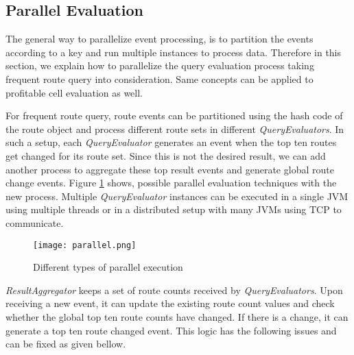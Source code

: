 \subsection{Parallel Evaluation}
The general way to parallelize event processing, is to partition the events according to a key and run multiple instances to process data. Therefore in this section, we explain how to parallelize the query evaluation process taking frequent route query into consideration. Same concepts can be applied to profitable cell evaluation as well.

For frequent route query, route events can be partitioned using the hash code of the route object and process different route sets in different \textit{QueryEvaluators}. In such a setup, each \textit{QueryEvaluator} generates an event when the top ten routes get changed for its route set. Since this is not the desired result, we can add another process to aggregate these top result events and generate global route change events. Figure \ref{parallel} shows, possible parallel evaluation techniques with the new process. Multiple \textit{QueryEvaluator} instances can be executed in a single JVM using multiple threads or in a distributed setup with many JVMs using TCP to communicate. 

\begin{figure}[!t]
        \centering
        \texttt{[image: parallel.png]}
        \caption{Different types of parallel execution}
        \label{parallel}
\end{figure}

\textit{ResultAggregator} keeps a set of route counts received by \textit{QueryEvaluators}. Upon receiving a new event, it can update the existing route count values and check whether the global top ten route counts have changed. If there is a change, it can generate a top ten route changed event. This logic has the following issues and can be fixed as given bellow.

